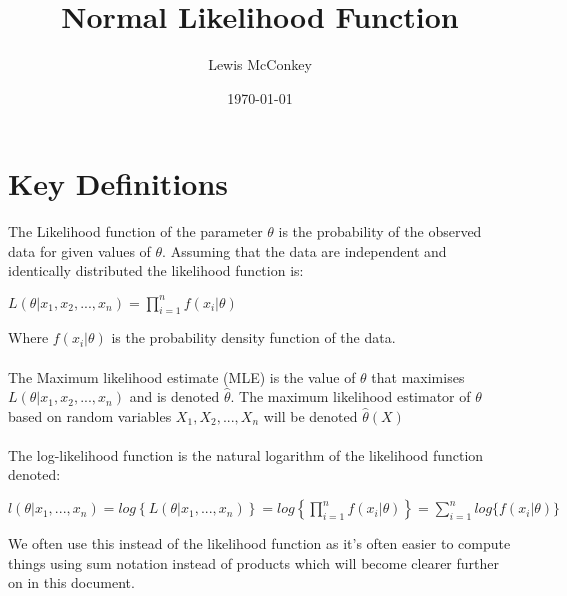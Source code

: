 \documentclass[,oneside]{article}
\author{Lewis McConkey}
\date{\today}
\title{ \LARGE{Normal Likelihood Function}}
\numberwithin{equation}{section}
\begin{document}
\maketitle
\section{Key Definitions}
The Likelihood function of the parameter $\theta$ is the probability of the observed data for given values of $\theta$. Assuming that the data are independent and identically distributed  the likelihood function is:
\begin{center}
$L(\theta|x_1, x_2,..., x_n)= \prod\limits_{ i = 1}^{n} f(x_i|\theta)$
\end{center}
Where $f(x_i|\theta)$ is the probability density function of the data.\\ \\
The Maximum likelihood estimate (MLE) is the value of $\theta$ that maximises $L(\theta|x_1, x_2,..., x_n)$ and is denoted $\hat{\theta}.$ The maximum likelihood estimator of $\theta$ based on random variables $X_1,X_2,...,X_n$ will be denoted $\hat{\theta}(X)$\\ \\

The log-likelihood function is the natural logarithm of the likelihood function denoted:
\begin{center}
$l(\theta|x_1, ..., x_n)= log\left\{L(\theta|x_1,..., x_n)\right\}=log\left \{\prod\limits_{ i = 1}^{n} f(x_i|\theta)\right \}=\sum\limits_{i=1}^{n} log\{f(x_i|\theta)\}$
\end{center}
We often use this instead of the likelihood function as it's often easier to compute things using sum notation instead of products which will become clearer further on in this document.
\end{document}

